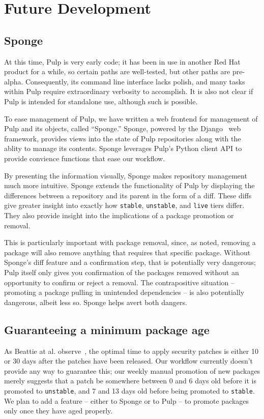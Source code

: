 \section{Future Development}
\label{sec:future}

\subsection{Sponge}

At this time, Pulp is very early code; it has been in use in another
Red Hat product for a while, so certain paths are well-tested, but
other paths are pre-alpha.  Consequently, its command line interface
lacks polish, and many tasks within Pulp require extraordinary
verbosity to accomplish.  It is also not clear if Pulp is intended for
standalone use, although such is possible.

To ease management of Pulp, we have written a web frontend for
management of Pulp and its objects, called ``Sponge.'' Sponge, powered
by the Django~\cite{Dja11} web framework, provides views into the
state of Pulp repositories along with the ablity to manage its
contents. Sponge leverages Pulp's Python client API to provide
convience functions that ease our workflow.

By presenting the information visually, Sponge makes repository
management much more intuitive. Sponge extends the functionality of
Pulp by displaying the differences between a repository and its parent
in the form of a diff. These diffs give greater insight into
exactly how \texttt{stable}, \texttt{unstable}, and \texttt{live}
tiers differ. They also provide insight into the implications of a
package promotion or removal.

This is particularly important with package removal, since, as noted,
removing a package will also remove anything that requires that
specific package.  Without Sponge's diff feature and a confirmation
step, that is potentially very dangerous; Pulp itself only gives you
confirmation of the packages removed without an opportunity to confirm
or reject a removal.  The contrapositive situation -- promoting a
package pulling in unintended dependencies -- is also potentially
dangerous, albeit less so.  Sponge helps avert both dangers.

\subsection{Guaranteeing a minimum package age}

As Beattie at al. observe~\cite{BACWWS02}, the optimal time to apply
security patches is either 10 or 30 days after the patches have been
released.  Our workflow currently doesn't provide any way to guarantee
this; our weekly manual promotion of new packages merely suggests that
a patch be somewhere between 0 and 6 days old before it is promoted to
\texttt{unstable}, and 7 and 13 days old before being promoted to
\texttt{stable}.  We plan to add a feature -- either to Sponge or to
Pulp -- to promote packages only once they have aged properly.

